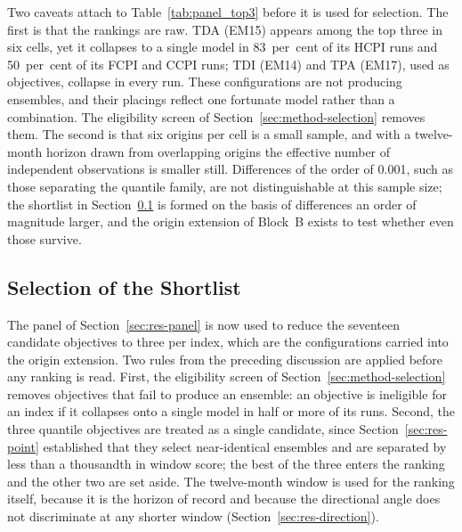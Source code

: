 \documentclass[12pt]{article}
\begin{document}
Two caveats attach to Table~\ref{tab:panel_top3} before it is used for
selection. The first is that the rankings are raw. TDA (EM15) appears among the
top three in six cells, yet it collapses to a single model in 83~per~cent of
its HCPI runs and 50~per~cent of its FCPI and CCPI runs; TDI (EM14) and TPA
(EM17), used as objectives, collapse in every run. These configurations are not
producing ensembles, and their placings reflect one fortunate model rather than
a combination. The eligibility screen of Section~\ref{sec:method-selection}
removes them. The second is that six origins per cell is a small sample, and
with a twelve-month horizon drawn from overlapping origins the effective number
of independent observations is smaller still. Differences of the order of
0.001, such as those separating the quantile family, are not distinguishable at
this sample size; the shortlist in Section~\ref{sec:res-selection} is formed on
the basis of differences an order of magnitude larger, and the origin extension
of Block~B exists to test whether even those survive.

\subsection{Selection of the Shortlist}
\label{sec:res-selection}

The panel of Section~\ref{sec:res-panel} is now used to reduce the seventeen
candidate objectives to three per index, which are the configurations carried
into the origin extension. Two rules from the preceding discussion are applied
before any ranking is read. First, the eligibility screen of
Section~\ref{sec:method-selection} removes objectives that fail to produce an
ensemble: an objective is ineligible for an index if it collapses onto a single
model in half or more of its runs. Second, the three quantile objectives are
treated as a single candidate, since Section~\ref{sec:res-point} established
that they select near-identical ensembles and are separated by less than a
thousandth in window score; the best of the three enters the ranking and the
other two are set aside. The twelve-month window is used for the ranking
itself, because it is the horizon of record and because the directional angle
does not discriminate at any shorter window
(Section~\ref{sec:res-direction}).
\end{document}
